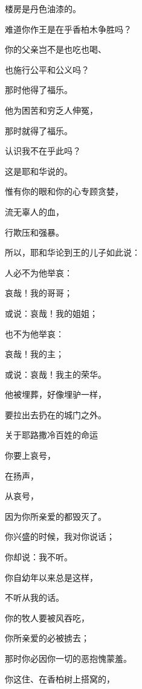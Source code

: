 {\par }{\Q 楼房是丹色油漆的。
\par }{\Q {}难道你作王是在乎{}香柏木{}争胜吗？
\par }{\Q 你的父亲岂不是也吃也喝、
\par }{\Q 也施行公平和公义吗？
\par }{\Q 那时他得了福乐。
\par }{\Q {}他为困苦和穷乏人伸冤，
\par }{\Q 那时就得了福乐。
\par }{\Q 认识我不在乎此吗？
\par }{\Q 这是耶和华说的。
\par }{\Q {}惟有你的眼和你的心专顾贪婪，
\par }{\Q 流无辜人的血，
\par }{\Q 行欺压和强暴。
\par }{\PP {}所以，耶和华论到{}王{}的儿子{}如此说：
\par }{\Q 人必不为他举哀{}：
\par }{\Q 哀哉！我的哥哥；
\par }{\Q 或说：哀哉！我的姐姐；
\par }{\Q 也不为他举哀{}：
\par }{\Q 哀哉！我的主；
\par }{\Q 或说：哀哉！我主的荣华。
\par }{\Q {}他被埋葬，好像埋驴一样，
\par }{\Q 要拉出去扔在{}的城门之外。
\par }{\SH 关于耶路撒冷百姓的命运
\par }{\Q {}你要上{}哀号，
\par }{\Q 在{}扬声，
\par }{\Q 从{}哀号，
\par }{\Q 因为你所亲爱的都毁灭了。
\par }{\Q {}你兴盛的时候，我对你说话；
\par }{\Q 你却说：我不听。
\par }{\Q 你自幼年以来总是这样，
\par }{\Q 不听从我的话。
\par }{\Q {}你的牧人要被风吞吃，
\par }{\Q 你所亲爱的必被掳去；
\par }{\Q 那时你必因你一切的恶抱愧蒙羞。
\par }{\Q {}你这住{}、在香柏树上搭窝的，
}
